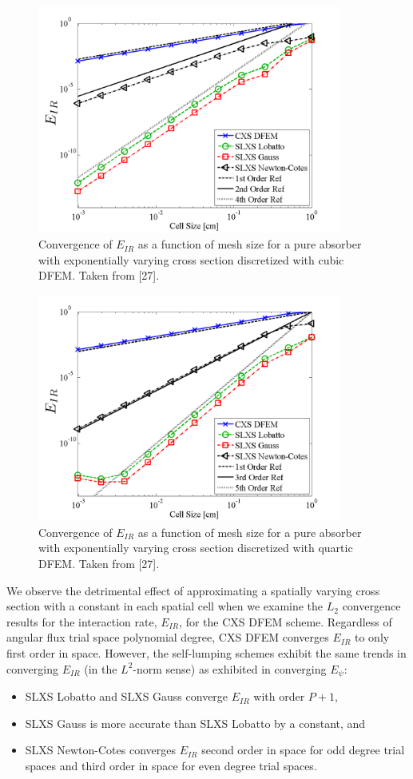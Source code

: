 \begin{figure}[!hbp]
\centering
\includegraphics[width=10cm]{chapter3_variable_xs/P3_VarXS_E_I_L2.png}
\caption{Convergence of $E_{IR}$  as a function of mesh size for a pure absorber with exponentially varying cross section discretized with cubic DFEM.  Taken from [27].}
\label{fig:varxs_I_L2_p3}
\end{figure}
%
%
\begin{figure}[!htp]
\centering
\includegraphics[width=10cm]{chapter3_variable_xs/P4_VarXS_E_I_L2.png}
\caption{Convergence of $E_{IR}$  as a function of mesh size for a pure absorber with exponentially varying cross section discretized with quartic DFEM.  Taken from [27].}
\label{fig:varxs_I_L2_p4}
\end{figure}
We observe the detrimental effect of approximating a spatially varying cross section with a constant in each spatial cell when we examine the $L_2$ convergence results for the interaction rate, $E_{IR}$, for the CXS DFEM scheme.
Regardless of angular flux trial space polynomial degree, CXS DFEM converges $E_{IR}$ to only first order in space.
However, the self-lumping schemes exhibit the same trends in converging $E_{IR}$ (in the $L^2$-norm sense) as exhibited in converging $E_{\psi}$:
\begin{itemize}
\item SLXS Lobatto and SLXS Gauss converge $E_{IR}$ with order $P+1$,
\item SLXS Gauss is more accurate than SLXS Lobatto by a constant, and
\item SLXS Newton-Cotes converges $E_{IR}$ second order in space for odd degree trial spaces and third order in space for even degree trial spaces.
\end{itemize}  

